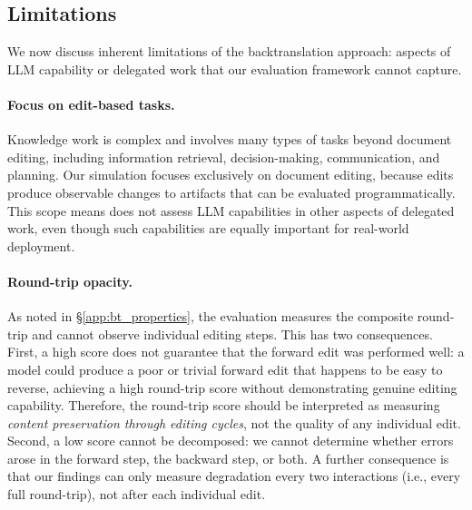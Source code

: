 \documentclass{article} %
\begin{document}
\subsection{Limitations} \label{app:bt_limitations}

We now discuss inherent limitations of the backtranslation approach: aspects of LLM capability or delegated work that our evaluation framework cannot capture.

\paragraph{Focus on edit-based tasks.} Knowledge work is complex and involves many types of tasks beyond document editing, including information retrieval, decision-making, communication, and planning. Our simulation focuses exclusively on document editing, because edits produce observable changes to artifacts that can be evaluated programmatically. This scope means \benchmark{} does not assess LLM capabilities in other aspects of delegated work, even though such capabilities are equally important for real-world deployment.

\paragraph{Round-trip opacity.} As noted in \S\ref{app:bt_properties}, the evaluation measures the composite round-trip and cannot observe individual editing steps. This has two consequences. First, a high score does not guarantee that the forward edit was performed well: a model could produce a poor or trivial forward edit that happens to be easy to reverse, achieving a high round-trip score without demonstrating genuine editing capability. Therefore, the round-trip score should be interpreted as measuring \textit{content preservation through editing cycles}, not the quality of any individual edit. Second, a low score cannot be decomposed: we cannot determine whether errors arose in the forward step, the backward step, or both. A further consequence is that our findings can only measure degradation every two interactions (i.e., every full round-trip), not after each individual edit.
\end{document}
